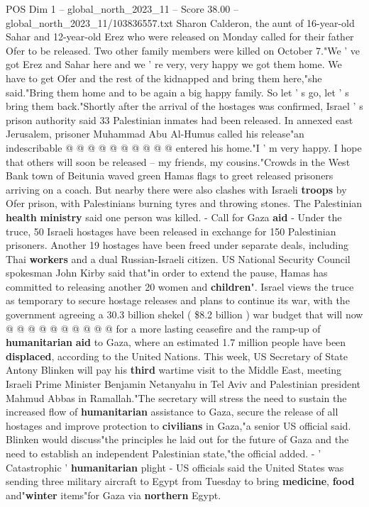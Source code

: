 \begin{textsample}{POS Dim 1 – global\_north\_2023\_11 – Score 38.00 – global\_north\_2023\_11/103836557.txt}
Sharon Calderon, the aunt of 16-year-old Sahar and 12-year-old Erez who were released on Monday called for their father Ofer to be released.
Two other family members were killed on October 7."We ' ve got Erez and Sahar here and we ' re very, very happy we got them home.
We have to get Ofer and the rest of the kidnapped and bring them here,"she said."Bring them home and to be again a big happy family.
So let ' s go, let ' s bring them back."Shortly after the arrival of the hostages was confirmed, Israel ' s prison authority said 33 Palestinian inmates had been released.
In annexed east Jerusalem, prisoner Muhammad Abu Al-Humus called his release"an indescribable @ @ @ @ @ @ @ @ @ @ entered his home."I ' m very happy.
I hope that others will soon be released -- my friends, my cousins."Crowds in the West Bank town of Beitunia waved green Hamas flags to greet released prisoners arriving on a coach.
But nearby there were also clashes with Israeli \textbf{troops} by Ofer prison, with Palestinians burning tyres and throwing stones.
The Palestinian \textbf{health} \textbf{ministry} said one person was killed. - Call for Gaza \textbf{aid} - Under the truce, 50 Israeli hostages have been released in exchange for 150 Palestinian prisoners.
Another 19 hostages have been freed under separate deals, including Thai \textbf{workers} and a dual Russian-Israeli citizen.
US National Security Council spokesman John Kirby said that"in order to extend the pause, Hamas has committed to releasing another 20 women and \textbf{children}".
Israel views the truce as temporary to secure hostage releases and plans to continue its war, with the government agreeing a 30.3 billion shekel ( \$8.2 billion ) war budget that will now @ @ @ @ @ @ @ @ @ @ for a more lasting ceasefire and the ramp-up of \textbf{humanitarian} \textbf{aid} to Gaza, where an estimated 1.7 million people have been \textbf{displaced}, according to the United Nations.
This week, US Secretary of State Antony Blinken will pay his \textbf{third} wartime visit to the Middle East, meeting Israeli Prime Minister Benjamin Netanyahu in Tel Aviv and Palestinian president Mahmud Abbas in Ramallah."The secretary will stress the need to sustain the increased flow of \textbf{humanitarian} assistance to Gaza, secure the release of all hostages and improve protection to \textbf{civilians} in Gaza,"a senior US official said.
Blinken would discuss"the principles he laid out for the future of Gaza and the need to establish an independent Palestinian state,"the official added. - ' Catastrophic ' \textbf{humanitarian} plight - US officials said the United States was sending three military aircraft to Egypt from Tuesday to bring \textbf{medicine}, \textbf{food} and"\textbf{winter} items"for Gaza via \textbf{northern} Egypt.

\end{textsample}

